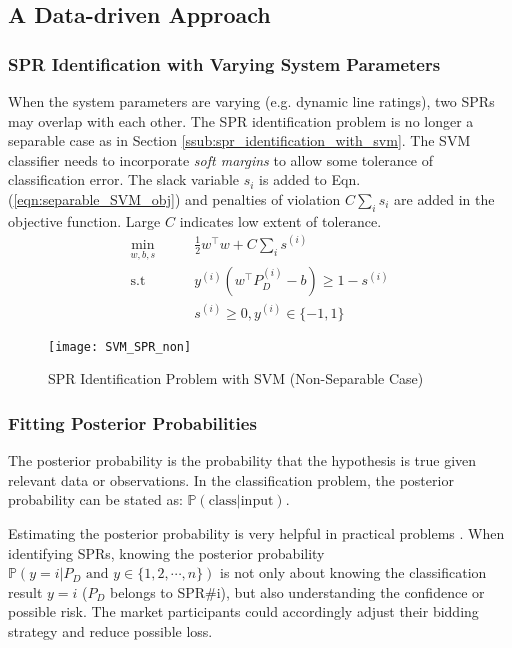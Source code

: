 \documentclass[letterpaper, 11pt]{article}
\theoremstyle{plain}
\theoremstyle{definition}
\begin{document}
\subsection{A Data-driven Approach} \label{sub:extended_data_driven_approach}
\subsubsection{SPR Identification with Varying System Parameters} \label{ssub:spr_identification_with_varying_system_parameters}
When the system parameters are varying (e.g. dynamic line ratings), two SPRs may overlap with each other. The SPR identification problem is no longer a separable case as in Section \ref{ssub:spr_identification_with_svm}. The SVM classifier needs to incorporate \emph{soft margins} to allow some tolerance of classification error. The slack variable $s_i$ is added to Eqn. (\ref{eqn:separable_SVM_obj}) and penalties of violation $C\sum_i s_i$ are added in the objective function. Large $C$ indicates low extent of tolerance.
\begin{subequations}
\begin{align}
  \min_{w,b,s} & \qquad { \frac{1}{2} w^\intercal  w + C\sum_i s^{(i)} } \label{eqn:non_sep_SVM_obj} \\ 
  \text{s.t} & \qquad y^{(i)}(w^\intercal  P_D^{(i)} -b) \ge 1-s^{(i)} \label{eqn:non_sep_SVM_cons} \\
 			 & \qquad s^{(i)} \ge 0, y^{(i)} \in \{-1,1\} \nonumber	
\end{align}
\end{subequations}
\begin{figure}[htbp]
  \centering
  \texttt{[image: SVM\_SPR\_non]}
  \caption{SPR Identification Problem with SVM (Non-Separable Case)}
  \label{fig:SVM_SPR_non}
\end{figure}





\subsubsection{Fitting Posterior Probabilities} \label{ssub:fitting_posterior_probabilities}

The posterior probability is the probability that the hypothesis is true given relevant data or observations.
In the classification problem, the posterior probability can be stated as: $\mathbb{P}(\text{class}|\text{input})$.

Estimating the posterior probability is very helpful in practical problems \cite{Platt1999}. 
When identifying SPRs, knowing the posterior probability $\mathbb{P}( y = i | P_D \text{ and } y \in \{1,2,\cdots,n\})$ is not only about knowing the classification result $y = i$ ($P_D$ belongs to SPR\#i), but also understanding the confidence or possible risk. The market participants could accordingly adjust their bidding strategy and reduce possible loss.
\end{document}
